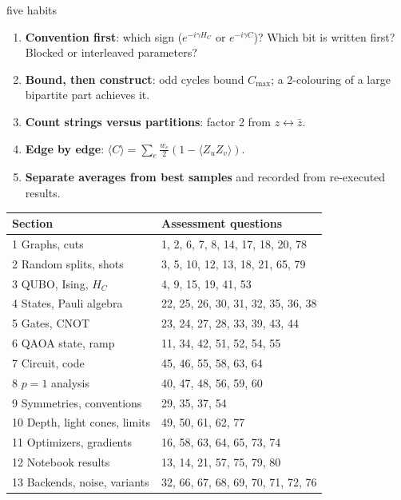\documentclass[11pt,a4paper,openany]{book}
\begin{document}
\begin{method}{five habits}
\begin{enumerate}[itemsep=1pt]
\item \textbf{Convention first}: which sign ($e^{-i\gamma H_C}$ or $e^{-i\gamma C}$)? Which bit is written first? Blocked or interleaved parameters?
\item \textbf{Bound, then construct}: odd cycles bound $C_{\max}$; a 2-colouring of a large bipartite part achieves it.
\item \textbf{Count strings versus partitions}: factor 2 from $z \leftrightarrow \bar z$.
\item \textbf{Edge by edge}: $\langle C\rangle = \sum_e\frac{w_e}{2}(1 - \langle Z_uZ_v\rangle)$.
\item \textbf{Separate averages from best samples} and recorded from re-executed results.
\end{enumerate}
\end{method}
\begin{center}\small
\begin{tabularx}{\linewidth}{@{}lX@{}}
\toprule Section & Assessment questions\\ \midrule
1 Graphs, cuts & 1, 2, 6, 7, 8, 14, 17, 18, 20, 78\\
2 Random splits, shots & 3, 5, 10, 12, 13, 18, 21, 65, 79\\
3 QUBO, Ising, $H_C$ & 4, 9, 15, 19, 41, 53\\
4 States, Pauli algebra & 22, 25, 26, 30, 31, 32, 35, 36, 38\\
5 Gates, CNOT & 23, 24, 27, 28, 33, 39, 43, 44\\
6 QAOA state, ramp & 11, 34, 42, 51, 52, 54, 55\\
7 Circuit, code & 45, 46, 55, 58, 63, 64\\
8 $p = 1$ analysis & 40, 47, 48, 56, 59, 60\\
9 Symmetries, conventions & 29, 35, 37, 54\\
10 Depth, light cones, limits & 49, 50, 61, 62, 77\\
11 Optimizers, gradients & 16, 58, 63, 64, 65, 73, 74\\
12 Notebook results & 13, 14, 21, 57, 75, 79, 80\\
13 Backends, noise, variants & 32, 66, 67, 68, 69, 70, 71, 72, 76\\ \bottomrule
\end{tabularx}
\end{center}

\end{document}
